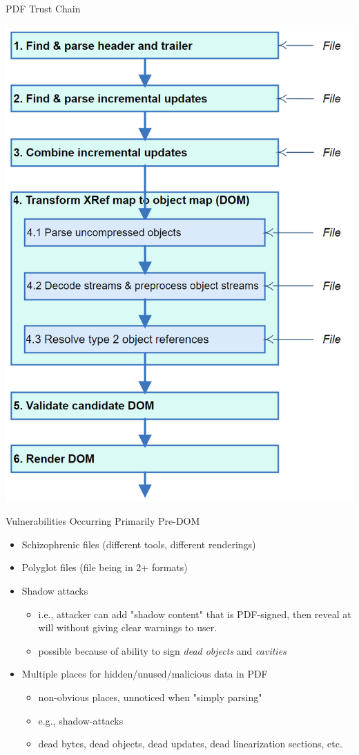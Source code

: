 \documentclass[t,10pt,xcolor={dvipsnames}]{beamer}
\begin{document}
\begin{frame}[label={sec:org0144db3}]{PDF Trust Chain}
\begin{center}
\includegraphics[width=0.47\linewidth]{../figures/Stages.png}
\end{center}
\end{frame}

\begin{frame}[label={sec:org728a087}]{Vulnerabilities Occurring Primarily Pre-DOM}
\begin{itemize}
\item Schizophrenic files (different tools, different renderings)
\item Polyglot files (file being in 2+ formats)
\item Shadow attacks
\begin{itemize}
\item i.e., attacker can add "shadow content" that is PDF-signed, then reveal
at will without giving clear warnings to user.
\item possible because of ability to sign \emph{dead objects} and \emph{cavities}
\end{itemize}
\item Multiple places for hidden/unused/malicious data in PDF
\begin{itemize}
\item non-obvious places, unnoticed when "simply parsing"
\item e.g., shadow-attacks
\item dead bytes, dead objects, dead updates, dead linearization sections, etc.
\end{itemize}
\end{itemize}
\end{frame}
\end{document}

